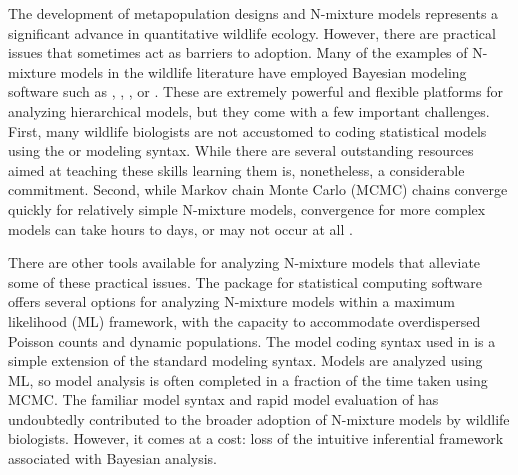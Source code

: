 \documentclass[codesnippet]{jss}
\begin{document}
The development of metapopulation designs and N-mixture models represents a significant advance in quantitative wildlife ecology. However, there are practical issues that sometimes act as barriers to adoption. Many of the examples of N-mixture models in the wildlife literature have employed Bayesian modeling software such as , , , or   \citep{plummer2003jags,Lunn_Jackson_Best_Thomas_Spiegelhalter_2012,Carpenter_Gelman_Hoffman_Lee_et_al_2017}. These are extremely powerful and flexible platforms for analyzing hierarchical models, but they come with a few important challenges. First, many wildlife biologists are not accustomed to coding statistical models using the  or  modeling syntax. While there are several outstanding resources aimed at teaching these skills  \citep{Royle_Dorazio_2008, Kery_2010, Kery_Schaub_2011, Kery_Royle_2015, Korner-Nievergelt_Roth_et_al_2015} learning them is, nonetheless, a considerable commitment. Second, while Markov chain Monte Carlo (MCMC) chains converge quickly for relatively simple N-mixture models, convergence for more complex models can take hours to days, or may not occur at all \citep{Kery_Schaub_2011}.

There are other tools available for analyzing N-mixture models that 
alleviate some of these practical issues. The  package 
\citep{Fiske_Chandler_2011} for  statistical computing software 
\citep{R_Core_Team_2016} offers several options for analyzing N-mixture 
models within a maximum likelihood (ML) framework, with the capacity to 
accommodate overdispersed Poisson counts and dynamic populations. The model 
coding 
syntax used in  is a simple extension of the standard 
 modeling syntax. Models are analyzed using ML, so model 
analysis is often completed in a fraction of the time taken using MCMC. The 
familiar model syntax and rapid model evaluation of  has 
undoubtedly contributed to the broader adoption of N-mixture models by 
wildlife biologists. However, it comes at a cost: loss of the intuitive 
inferential framework associated with Bayesian analysis.
\end{document}
